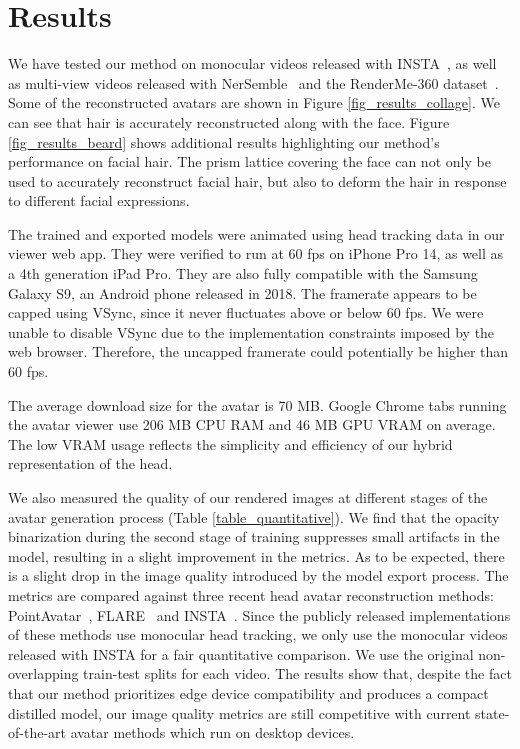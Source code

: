 \section{Results}


We have tested our method on monocular videos released with INSTA~\cite{zielonka2023insta}, as well as multi-view videos released with NerSemble~\cite{kirschstein2023nersemble} and the RenderMe-360 dataset~\cite{pan2023renderme}. Some of the reconstructed avatars are shown in Figure \ref{fig_results_collage}. We can see that hair is accurately reconstructed along with the face. Figure \ref{fig_results_beard} shows additional results highlighting our method's performance on facial hair. The prism lattice covering the face can not only be used to accurately reconstruct facial hair, but also to deform the hair in response to different facial expressions.

The trained and exported models were animated using head tracking data in our viewer web app. They were verified to run at 60 fps on iPhone Pro 14, as well as a 4th generation iPad Pro. They are also fully compatible with the Samsung Galaxy S9, an Android phone released in 2018. The framerate appears to be capped using VSync, since it never fluctuates above or below 60 fps. We were unable to disable VSync due to the implementation constraints imposed by the web browser. Therefore, the uncapped framerate could potentially be higher than 60 fps.

The average download size for the avatar is 70 MB. Google Chrome tabs running the avatar viewer use 206 MB CPU RAM and 46 MB GPU VRAM on average. The low VRAM usage reflects the simplicity and efficiency of our hybrid representation of the head.

We also measured the quality of our rendered images at different stages of the avatar generation process (Table \ref{table_quantitative}). We find that the opacity binarization during the second stage of training suppresses small artifacts in the model, resulting in a slight improvement in the metrics. As to be expected, there is a slight drop in the image quality introduced by the model export process. The metrics are compared against three recent head avatar reconstruction methods: PointAvatar~\cite{zheng2023pointavatar}, FLARE~\cite{bharadwaj2023flare} and INSTA~\cite{zielonka2023insta}. Since the publicly released implementations of these methods use monocular head tracking, we only use the monocular videos released with INSTA for a fair quantitative comparison. We use the original non-overlapping train-test splits for each video. The results show that, despite the fact that our method prioritizes edge device compatibility and produces a compact distilled model, our image quality metrics are still competitive with current state-of-the-art avatar methods which run on desktop devices. 
